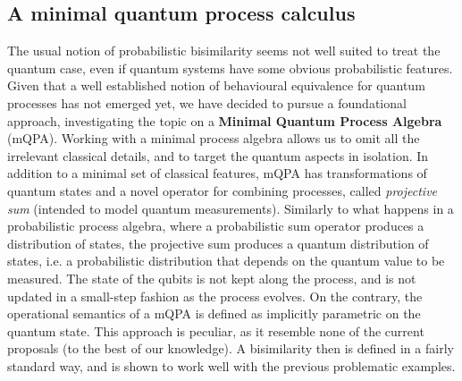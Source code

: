  
\subsection*{A minimal quantum process calculus}
 
The usual notion of probabilistic bisimilarity seems not well suited to treat the quantum case, even if quantum systems have some obvious probabilistic features. Given that a well established notion of behavioural equivalence for quantum processes has not emerged yet, we have decided to pursue a foundational approach, investigating the topic on a \textbf{Minimal Quantum Process Algebra} (mQPA).
Working with a minimal process algebra allows us to omit all the irrelevant classical details, and to target the quantum aspects in isolation.
In addition to a minimal set of classical features, mQPA has transformations of quantum states and a novel operator for combining processes, called \textit{projective sum} (intended to model quantum measurements).
Similarly to what happens in a probabilistic process algebra, where a probabilistic sum operator produces a distribution
of states, the projective sum produces a quantum distribution of states, i.e. a probabilistic distribution that depends on the quantum value
to be measured.
The state of the qubits is not kept along the process, and is not updated in a small-step fashion as the process evolves.
On the contrary, the operational semantics of a mQPA is defined as implicitly parametric on the quantum state.
This approach is peculiar, as it resemble none of the current proposals (to the best of our knowledge).
A bisimilarity then is defined in a fairly standard way, and is shown to work well with the previous problematic examples.
 